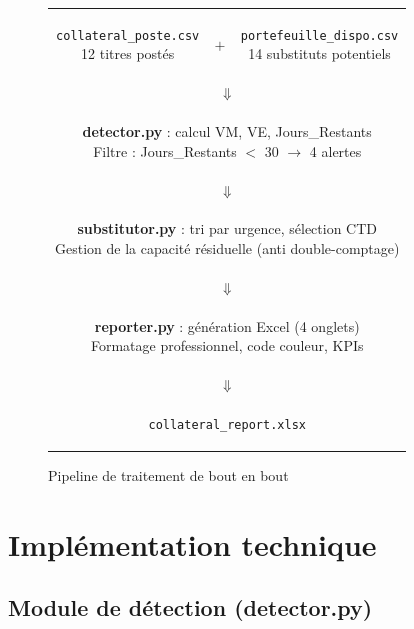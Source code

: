 \documentclass[12pt,a4paper]{article}
\begin{document}
\begin{figure}[H]
\centering
\renewcommand{\arraystretch}{1.5}
\begin{tabular}{ccc}
\colorbox{natixisBlue!10}{\parbox{3.5cm}{\centering\small\texttt{collateral\_poste.csv}\\12 titres postés}} &
\quad\Large$+$\quad &
\colorbox{natixisBlue!10}{\parbox{3.5cm}{\centering\small\texttt{portefeuille\_dispo.csv}\\14 substituts potentiels}} \\[12pt]
\multicolumn{3}{c}{$\Downarrow$} \\[4pt]
\multicolumn{3}{c}{\colorbox{natixisGray}{\parbox{8cm}{\centering\small
  \textbf{detector.py} : calcul VM, VE, Jours\_Restants\\
  Filtre : Jours\_Restants $<$ 30 $\rightarrow$ 4 alertes}}} \\[8pt]
\multicolumn{3}{c}{$\Downarrow$} \\[4pt]
\multicolumn{3}{c}{\colorbox{natixisGray}{\parbox{8cm}{\centering\small
  \textbf{substitutor.py} : tri par urgence, sélection CTD\\
  Gestion de la capacité résiduelle (anti double-comptage)}}} \\[8pt]
\multicolumn{3}{c}{$\Downarrow$} \\[4pt]
\multicolumn{3}{c}{\colorbox{natixisGray}{\parbox{8cm}{\centering\small
  \textbf{reporter.py} : génération Excel (4 onglets)\\
  Formatage professionnel, code couleur, KPIs}}} \\[8pt]
\multicolumn{3}{c}{$\Downarrow$} \\[4pt]
\multicolumn{3}{c}{\colorbox{natixisBlue!10}{\parbox{5cm}{\centering\small
  \texttt{collateral\_report.xlsx}}}} \\
\end{tabular}
\caption{Pipeline de traitement de bout en bout}
\end{figure}

\newpage
\section{Implémentation technique}

\subsection{Module de détection (detector.py)}
\end{document}
